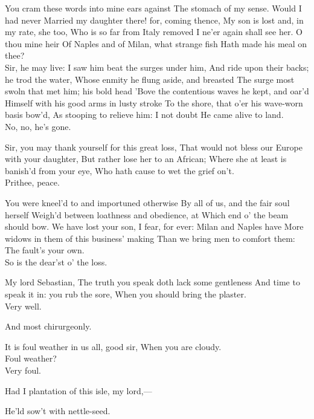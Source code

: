 \documentclass[11pt]{book}
\begin{document}
\6	You cram these words into mine ears against
	The stomach of my sense. Would I had never
	Married my daughter there! for, coming thence,
	My son is lost and, in my rate, she too,
	Who is so far from Italy removed
	I ne'er again shall see her. O thou mine heir
	Of Naples and of Milan, what strange fish
	Hath made his meal on thee? \\

	Sir, he may live:
	I saw him beat the surges under him,
	And ride upon their backs; he trod the water,
	Whose enmity he flung aside, and breasted
	The surge most swoln that met him; his bold head
	'Bove the contentious waves he kept, and oar'd
	Himself with his good arms in lusty stroke
	To the shore, that o'er his wave-worn basis bow'd,
	As stooping to relieve him: I not doubt
	He came alive to land. \\

\6	No, no, he's gone.

\8	Sir, you may thank yourself for this great loss,
	That would not bless our Europe with your daughter,
	But rather lose her to an African;
	Where she at least is banish'd from your eye,
	Who hath cause to wet the grief on't.  \\

\6	Prithee, peace.

\8	You were kneel'd to and importuned otherwise
	By all of us, and the fair soul herself
	Weigh'd between loathness and obedience, at
	Which end o' the beam should bow. We have lost your son,
	I fear, for ever: Milan and Naples have
	More widows in them of this business' making
	Than we bring men to comfort them:
	The fault's your own. \\

\6	So is the dear'st o' the loss.

\9	My lord Sebastian,
	The truth you speak doth lack some gentleness
	And time to speak it in: you rub the sore,
	When you should bring the plaster.  \\

\8	Very well.

\7	And most chirurgeonly.

\9	It is foul weather in us all, good sir,
	When you are cloudy. \\

\8	Foul weather? \\

\7	Very foul.

\9	Had I plantation of this isle, my lord,---

\7	He'ld sow't with nettle-seed.
\end{document}
